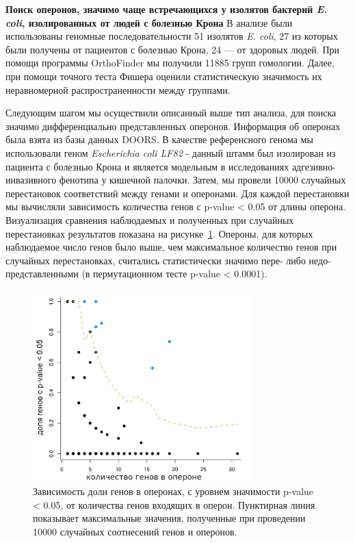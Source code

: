 \textbf{Поиск оперонов, значимо чаще встречающихся у изолятов бактерий \textit{E. coli}, изолированных от людей с болезнью Крона}
В анализе были использованы геномные последовательности 51 изолятов \textit{E. coli}, 27 из которых были получены от пациентов с болезнью Крона, 24 --- от здоровых людей. При помощи программы OrthoFinder мы получили 11885 групп гомологии. Далее, при помощи точного теста Фишера оценили статистическую значимость их неравномерной распространенности между группами.  

Следующим шагом мы осуществили описанный выше тип анализа, для поиска значимо дифференциально представленных оперонов. Информация об оперонах была взята из базы данных DOORS. В качестве референсного генома мы использовали геном \textit{Escherichia coli LF82} - данный штамм был изолирован из пациента с болезнью Крона и является модельным в исследованиях адгезивно-инвазивного фенотипа у кишечной палочки. Затем, мы провели 10000 случайных перестановок соответствий между генами и оперонами. Для каждой перестановки мы вычисляли зависимость количества генов с p-value < 0.05 от длины оперона. Визуализация сравнения наблюдаемых и полученных при случайных перестановках результатов показана на рисунке~\ref{img:operons_shuffle}. Опероны, для которых наблюдаемое число генов было выше, чем максимальное количество генов при случайных перестановках, считались статистически значимо пере- либо недо-представленными (в пермутационном тесте p-value < 0.0001). 

\begin{figure}[!ht] 
  \center
    \includegraphics [width=0.75\textwidth] {Dissertation/images/operons/statsignificant_operons.png}
    \caption{Зависимость доли генов в оперонах, с уровнем значимости p-value < 0.05, от количества генов входящих в оперон. Пунктирная линия показывает максимальные значения, полученные при проведении 10000 случайных соотнесений генов и оперонов.}
    \label{img:operons_shuffle}
\end{figure}

